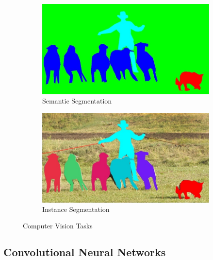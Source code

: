 \begin{figure}
    \hfill
    \begin{subfigure}{\VisionTasksImageWidth}
        \includegraphics[width=\textwidth]{images/vision_task_3}
        \caption{Semantic Segmentation}
        \label{fig:cv_task_semseg}
    \end{subfigure}
    \hfill
    \begin{subfigure}{\VisionTasksImageWidth}
        \includegraphics[width=\textwidth]{images/vision_task_4}
        \caption{Instance Segmentation}
        \label{fig:cv_task_inseg}
    \end{subfigure}
    \hfill

    \caption{Computer Vision Tasks~\cite{coco15}}
    \label{fig:cv_tasks}
\end{figure}

\subsection{Convolutional Neural Networks}
\label{sec:cnn}

